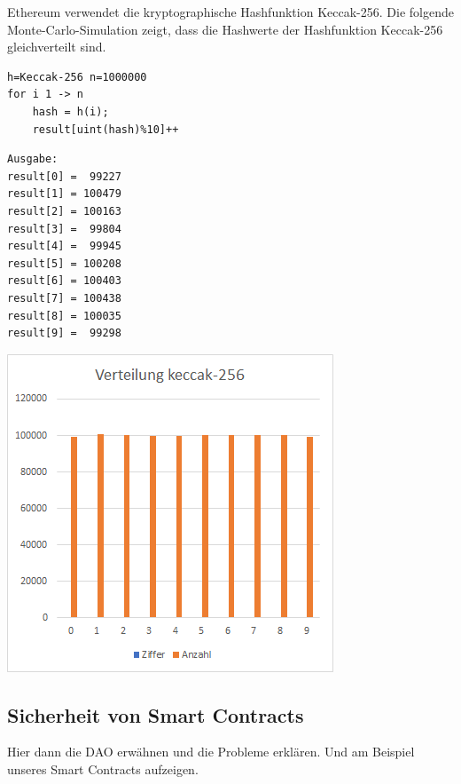 Ethereum verwendet die kryptographische Hashfunktion Keccak-256.
Die folgende Monte-Carlo-Simulation zeigt, dass die Hashwerte der Hashfunktion Keccak-256 gleichverteilt sind.
\begin{verbatim}
h=Keccak-256 n=1000000
for i 1 -> n
    hash = h(i);
    result[uint(hash)%10]++
\end{verbatim}
\begin{minipage}{0.5\textwidth}
\begin{verbatim}
Ausgabe:
result[0] =  99227
result[1] = 100479
result[2] = 100163
result[3] =  99804
result[4] =  99945
result[5] = 100208
result[6] = 100403
result[7] = 100438
result[8] = 100035
result[9] =  99298
\end{verbatim}
\end{minipage}
\begin{minipage}{0.5\textwidth}
\includegraphics[width=\textwidth]{Figures/verteilung_keccak256}
\centering
\decoRule
{}
\label{fig:verteilung_keccak256}
\end{minipage}

\subsection{Sicherheit von Smart Contracts}
Hier dann die DAO erwähnen und die Probleme erklären. Und am Beispiel unseres Smart Contracts aufzeigen. 


